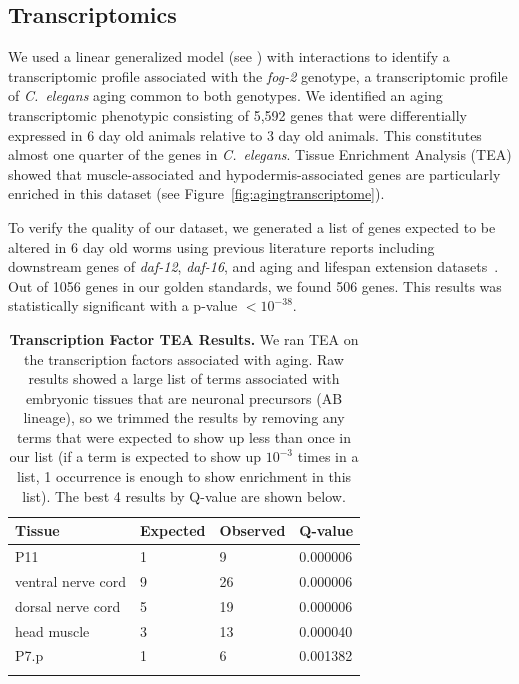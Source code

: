 \documentclass[9pt,twocolumn,twoside]{gsag3jnl}
\newcommand{\cel}{\emph{C.~elegans}}
\newcommand{\fog}{\emph{fog-2}}
\newcommand{\agen}{5,592}
\newcommand{\goldn}{1056}
\newcommand{\goldfound}{506}
\newcommand{\goldpval}{$<10^{-38}$}
\begin{document}
\subsection*{Transcriptomics}
\label{sub:Transcriptomics}

We used a linear generalized model (see ) with interactions to identify a transcriptomic profile associated with the \fog{} genotype, a transcriptomic profile of \cel{} aging common to both genotypes. We identified an aging transcriptomic phenotypic consisting of \agen{} genes that were differentially expressed in 6 day old animals relative to 3 day old animals. This constitutes almost one quarter of the genes in \cel{}. Tissue Enrichment Analysis (TEA) showed that muscle-associated and hypodermis-associated genes are particularly enriched in this dataset (see Figure~\ref{fig:agingtranscriptome}).

To verify the quality of our dataset, we generated a list of genes expected to be altered in 6 day old worms using previous literature reports including downstream genes of \emph{daf-12}, \emph{daf-16}, and aging and lifespan extension datasets~\citep{}. Out of \goldn{} genes in our golden standards, we found \goldfound{} genes. This results was statistically significant with a p-value \goldpval{}.

\begin{table}[htbp]
\renewcommand{\familydefault}{\sfdefault}\normalfont{}
\centering
\caption{\textbf{Transcription Factor TEA Results.} We ran TEA on the transcription factors associated with aging. Raw results showed a large list of terms associated with embryonic tissues that are neuronal precursors (AB lineage), so we trimmed the results by removing any terms that were expected to show up less than once in our list (if a term is expected to show up $10^{-3}$ times in a list, 1 occurrence is enough to show enrichment in this list). The best 4 results by Q-value are shown below.}
\begin{tableminipage}{\textwidth}
\begin{tabularx}{\textwidth}{XXXX}
\toprule
\header{}Tissue & Expected & Observed & Q-value \\
\bottomrule{}
P11	& 1 & 9 & 0.000006\\
ventral nerve cord &	9 &	26 &	0.000006\\
dorsal nerve cord &	5 &	19 & 0.000006\\
head muscle	& 3	& 13 &	0.000040\\
P7.p & 1 &	6	& 0.001382\\
\bottomrule{}
\end{tabularx}
\label{tab:tea_tf_age}
\end{tableminipage}
\end{table}
\end{document}
